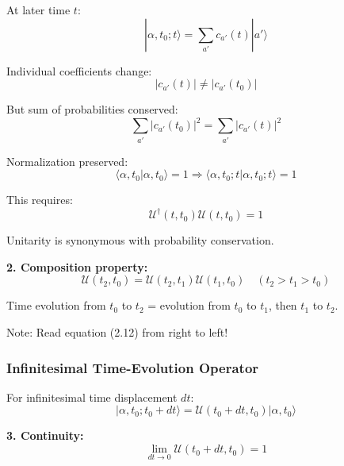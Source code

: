 \documentclass[11pt,a4paper]{article}
\begin{document}
At later time $t$:
\begin{equation}
|\alpha, t_0; t\rangle = \sum_{a'}c_{a'}(t)|a'\rangle
\tag{2.7}
\end{equation}

Individual coefficients change:
\begin{equation}
|c_{a'}(t)| \neq |c_{a'}(t_0)|
\tag{2.8}
\end{equation}

But sum of probabilities conserved:
\begin{equation}
\sum_{a'}|c_{a'}(t_0)|^2 = \sum_{a'}|c_{a'}(t)|^2
\tag{2.9}
\end{equation}

Normalization preserved:
\begin{equation}
\langle\alpha, t_0|\alpha, t_0\rangle = 1 \Rightarrow \langle\alpha, t_0; t|\alpha, t_0; t\rangle = 1
\tag{2.10}
\end{equation}

This requires:
\begin{equation}
\boxed{\mathscr{U}^\dagger(t, t_0)\mathscr{U}(t, t_0) = 1}
\tag{2.11}
\end{equation}

Unitarity is synonymous with probability conservation.

\textbf{2. Composition property:}
\begin{equation}
\mathscr{U}(t_2, t_0) = \mathscr{U}(t_2, t_1)\mathscr{U}(t_1, t_0) \quad (t_2 > t_1 > t_0)
\tag{2.12}
\end{equation}

Time evolution from $t_0$ to $t_2$ = evolution from $t_0$ to $t_1$, then $t_1$ to $t_2$.

Note: Read equation (2.12) from right to left!

\subsubsection{Infinitesimal Time-Evolution Operator}

For infinitesimal time displacement $dt$:
\begin{equation}
|\alpha, t_0; t_0 + dt\rangle = \mathscr{U}(t_0 + dt, t_0)|\alpha, t_0\rangle
\tag{2.13}
\end{equation}

\textbf{3. Continuity:}
\begin{equation}
\lim_{dt \to 0}\mathscr{U}(t_0 + dt, t_0) = 1
\tag{2.14}
\end{equation}
\end{document}
